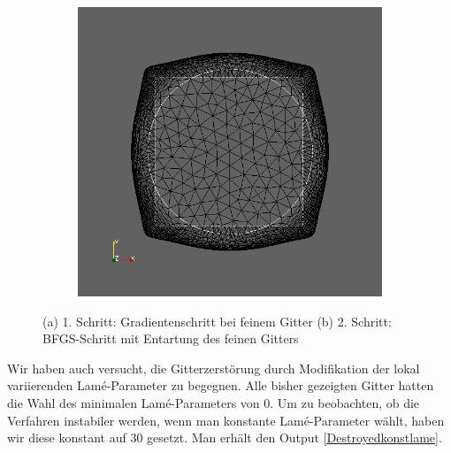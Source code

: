 \documentclass[bibliography=totoc,12pt,a4paper]{scrartcl}
\theoremstyle{exampstyle}
\numberwithin{equation}{section}
\begin{document}
\begin{figure}
\begin{subfigure}{0.5\textwidth}
	\includegraphics[scale=0.25]{pic_smallcircle_bfgsdestroyed2.jpg}
	\caption{}	
	\end{subfigure}
\caption{(a) 1. Schritt: Gradientenschritt bei feinem Gitter (b) 2. Schritt: BFGS-Schritt mit Entartung des feinen Gitters}
\label{Destroyedbfgs}
\end{figure}

Wir haben auch versucht, die Gitterzerstörung durch Modifikation der lokal variierenden Lamé-Parameter zu begegnen. Alle bisher gezeigten Gitter hatten die Wahl des minimalen Lamé-Parameters von 0. Um zu beobachten, ob die Verfahren instabiler werden, wenn man konstante Lamé-Parameter wählt, haben wir diese konstant auf 30 gesetzt. Man erhält den Output \ref{Destroyedkonstlame}.
\end{document}
